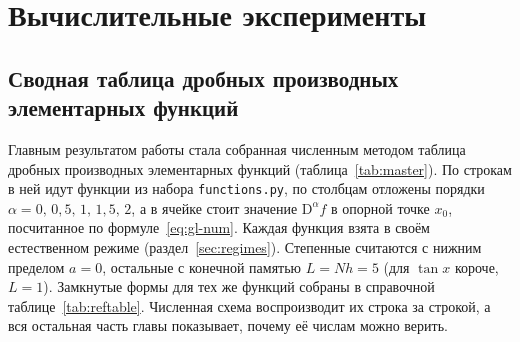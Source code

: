 \documentclass[14pt,a4paper]{extarticle}
\newcommand{\D}{\mathrm{D}}
\begin{document}
\section{Вычислительные эксперименты}

\subsection{Сводная таблица дробных производных элементарных функций}
\label{sec:master}

Главным результатом работы стала собранная численным методом таблица дробных производных элементарных функций (таблица~\ref{tab:master}). По строкам в ней идут функции из набора \texttt{functions.py}, по столбцам отложены порядки $\alpha=0,\,0{,}5,\,1,\,1{,}5,\,2$, а в ячейке стоит значение $\D^{\alpha}f$ в опорной точке $x_0$, посчитанное по формуле~\eqref{eq:gl-num}. Каждая функция взята в своём естественном режиме (раздел~\ref{sec:regimes}). Степенные считаются с нижним пределом $a=0$, остальные с конечной памятью $L=Nh=5$ (для $\tan x$ короче, $L=1$). Замкнутые формы для тех же функций собраны в справочной таблице~\ref{tab:reftable}. Численная схема воспроизводит их строка за строкой, а вся остальная часть главы показывает, почему её числам можно верить.
\end{document}
